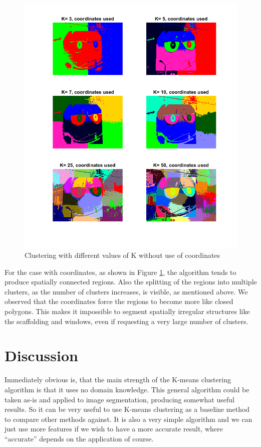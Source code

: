 \begin{figure}[h!]
\centering
\includegraphics[width =0.8\linewidth]{figures/task2/mm_coords_manyK.png}
\caption{Clustering with different values of K without use of coordinates}
\label{fig:mm:coords:manyK}
\end{figure}

For the case with coordinates, as shown in Figure \ref{fig:mm:coords:manyK}, the algorithm tends to produce spatially connected regions. Also the splitting of the regions into multiple clusters, as the number of clusters increases, is visible, as mentioned above. We observed that the coordinates force the regions to become more like closed polygons. This makes it impossible to segment spatially irregular structures like the scaffolding and windows, even if requesting a very large number of clusters. 

\section{Discussion}
Immediately obvious is, that the main strength of the K-means clustering algorithm is that it uses no domain knowledge. This general algorithm could be taken as-is and applied to image segmentation, producing somewhat useful results. So it can be very useful to use K-means clustering as a baseline method to compare other methods against. It is also a very simple algorithm and we can just use more features if we wish to have a more accurate result, where ``accurate'' depends on the application of course.

